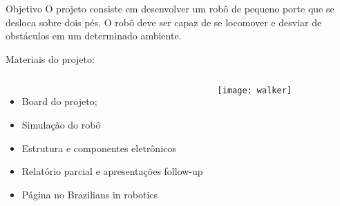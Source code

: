 %
\begin{frame}[t]{Objetivo} 
    O projeto consiste em desenvolver um robô de pequeno porte que se desloca sobre dois pés. O robô deve ser capaz de se locomover e desviar de obstáculos em um determinado ambiente.
    \vspace*{0.3cm}

    Materiais do projeto:
   
        \begin{columns}[c]
                \begin{itemize}
                    \item Board do projeto;
                    \item Simulação do robô
                    \item Estrutura e componentes eletrônicos
                    \item Relatório parcial e apresentações follow-up
                    \item Página no Brazilians in robotics
                \end{itemize}
                \texttt{[image: walker]}
        \end{columns}

\end{frame}
\begin{frame}[c]{} 
   
    \begin{center}
    \end{center}
       
\end{frame}
%
